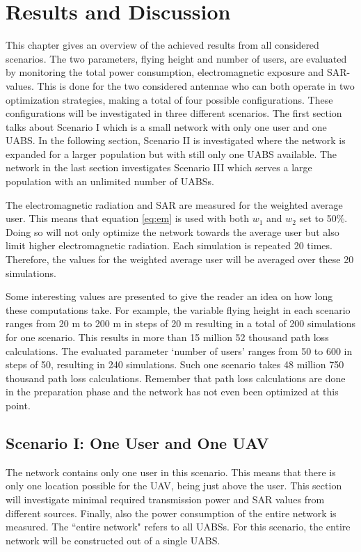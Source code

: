 \chapter{Results and Discussion}
\label{chap:results}

This chapter gives an overview of the achieved results from all considered scenarios. The two parameters,
flying height and number of users, are evaluated by monitoring the total power consumption, electromagnetic exposure and \gls{SAR}-values.
This is done for the two considered antennae who can both operate in two optimization strategies, making a total of four possible configurations.
These configurations will be investigated in three different scenarios.
The first section talks about Scenario I which is a small network with only one user and one \gls{UABS}. In 
the following section, Scenario II is investigated where the network is expanded for a larger population 
but with still only one \gls{UABS} available.
The network in the last section investigates Scenario III which serves a large population with an unlimited number of \gls{UABS}s.

The electromagnetic radiation and \gls{SAR} are 
measured for the weighted average user. This means that 
equation \ref{eq:em} is used with both $w_{1}$ and $w_{2}$ set to 50\%. Doing so will not only optimize the network 
towards the average user but also limit higher electromagnetic radiation. Each simulation is repeated 20 times. 
Therefore, the values for the weighted average user will be averaged over these 20 simulations.

Some interesting values are presented to give the reader an idea on how long these computations take.
For example, the variable flying height in each scenario ranges from 
20 m to 200 m in steps of 20 m resulting in a total of 200 simulations for one scenario. 
This results in more than 15 million 52 thousand path loss calculations.
The evaluated parameter  `number of users'
ranges from 50 to 600 in steps of 50, resulting 
in 240 simulations. Such one scenario takes 48 million 750 thousand path loss calculations. Remember that path loss calculations
are done in the preparation phase and the network has not even been optimized at this point.

\section{Scenario I: One User and One \gls{UAV}}
The network contains only one user in this scenario. This means that there is only one location possible for the \gls{UAV},
being just above 
the user. This section will investigate minimal required transmission power and SAR values from different sources.
Finally, also the power consumption of the entire network is measured. The  ``entire network" refers to all \gls{UABS}s. 
For this scenario, the entire network 
will be constructed out of a single \gls{UABS}.

